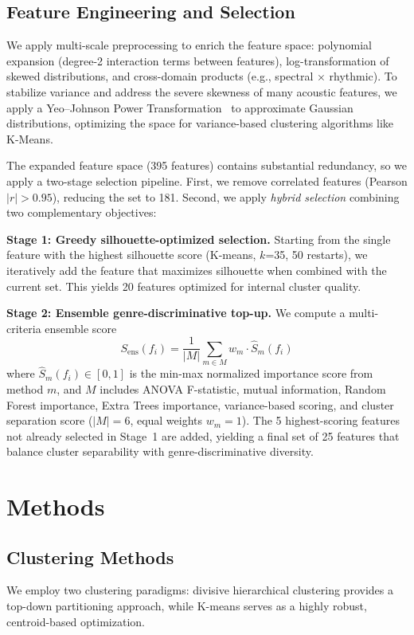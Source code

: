 \documentclass{article}
\begin{document}
	\subsection{Feature Engineering and Selection}\label{ssec:selection}

	We apply multi-scale preprocessing to enrich the feature space: polynomial expansion (degree-2 interaction terms between features), log-transformation of skewed distributions, and cross-domain products (e.g., spectral $\times$ rhythmic). To stabilize variance and address the severe skewness of many acoustic features, we apply a Yeo--Johnson Power Transformation~\cite{yeo2000new} to approximate Gaussian distributions, optimizing the space for variance-based clustering algorithms like K-Means.

	The expanded feature space (395 features) contains substantial redundancy, so we apply a two-stage selection pipeline. First, we remove correlated features (Pearson $|r| > 0.95$), reducing the set to 181. Second, we apply \emph{hybrid selection} combining two complementary objectives:

	\textbf{Stage 1: Greedy silhouette-optimized selection.} Starting from the single feature with the highest silhouette score (K-means, $k$=35, 50 restarts), we iteratively add the feature that maximizes silhouette when combined with the current set. This yields 20 features optimized for internal cluster quality.

	\textbf{Stage 2: Ensemble genre-discriminative top-up.} We compute a multi-criteria ensemble score
	\begin{equation}
		S_{\mathrm{ens}}(f_i) = \frac{1}{|M|}\sum_{m \in M} w_m \cdot \hat{S}_m(f_i)
	\end{equation}
	where $\hat{S}_m(f_i) \in [0,1]$ is the min-max normalized importance score from method $m$, and $M$ includes ANOVA F-statistic, mutual information, Random Forest importance, Extra Trees importance, variance-based scoring, and cluster separation score ($|M|=6$, equal weights $w_m=1$). The 5 highest-scoring features not already selected in Stage~1 are added, yielding a final set of 25 features that balance cluster separability with genre-discriminative diversity.


	\section{Methods}\label{sec:method}
	\subsection{Clustering Methods}
	We employ two clustering paradigms: divisive hierarchical clustering provides a top-down partitioning approach, while K-means serves as a highly robust, centroid-based optimization.
\end{document}
